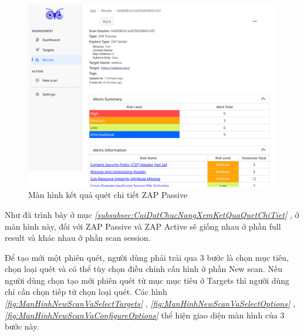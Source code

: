 \begin{figure}[H]
      \centering
      \includegraphics[width=\textwidth]{applied-thesis-chapters/chapter-6/Màn hình kết quả quét chi tiết ZAP Passive.png}
      \caption{Màn hình kết quả quét chi tiết ZAP Passive}
      \label{fig:ManHinhKetQuaQuetChiTietPassive}
\end{figure}

Như đã trình bày ở mục \textit{\ref{subsubsec:CaiDatChucNangXemKetQuaQuetChiTiet} }
, ở màn hình này, đối với ZAP Passive và ZAP Active sẽ giống nhau ở phần full result và khác nhau ở phần scan session.

\tab \tab Để tạo mới một phiên quét, người dùng phải trải qua 3 bước là chọn mục tiêu, chọn loại quét và có thể tùy chọn điều chỉnh cấu hình ở phần New scan.
Nếu người dùng chọn tạo mới phiên quét từ mục mục tiêu ở Targets thì người dùng chỉ cần chọn tiếp từ chọn loại quét.
Các hình \textit{\ref{fig:ManHinhNewScanVaSelectTargets} } 
, \textit{\ref{fig:ManHinhNewScanVaSelectOptions} }
, \textit{\ref{fig:ManHinhNewScanVaConfigureOptions} } 
thể hiện giao diện màn hình của 3 bước này.

